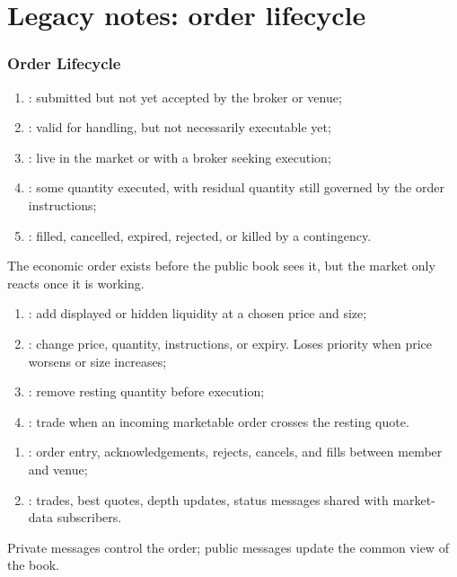 \documentclass[a4paper,oneside,openany]{book}
\begin{document}
\chapter*{Legacy notes: order lifecycle}

\subsection*{Order Lifecycle}

\begin{process} 
\begin{enumerate}[label=\roman*.]
\setlength{\itemsep}{0pt}
\item {}: submitted but not yet accepted by the broker or venue;
\item {}: valid for handling, but not necessarily executable yet;
\item {}: live in the market or with a broker seeking execution;
\item {}: some quantity executed, with residual quantity still governed by the order instructions;
\item {}: filled, cancelled, expired, rejected, or killed by a contingency.
\end{enumerate}
The economic order exists before the public book sees it, but the market only reacts once it is working.
\end{process}

\begin{process} 
\begin{enumerate}[label=\roman*.]
\setlength{\itemsep}{0pt}
\item {}: add displayed or hidden liquidity at a chosen price and size;
\item {}: change price, quantity, instructions, or expiry. Loses priority when price worsens or size increases;
\item {}: remove resting quantity before execution;
\item {}: trade when an incoming marketable order crosses the resting quote.
\end{enumerate}
\end{process}

\begin{taxonomy} 
\begin{enumerate}[label=\roman*.]
\setlength{\itemsep}{0pt}
\item {}: order entry, acknowledgements, rejects, cancels, and fills between member and venue;
\item {}: trades, best quotes, depth updates, status messages shared with market-data subscribers.
\end{enumerate}
Private messages control the order; public messages update the common view of the book.
\end{taxonomy}
\end{document}
